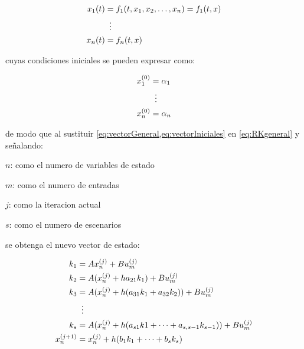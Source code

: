             
            \begin{equation}\label{eq:vectorGeneral}
                \begin{aligned}
                    x_1(t) &= f_1(t, x_1, x_2, \dots, x_n) = f_1(t,x)\\
                    &\mathrel{\makebox[\widthof{=}]{\vdots}}\\
                    x_n(t) &=  f_n(t,x)
                \end{aligned}
            \end{equation}

            \noindent cuyas condiciones iniciales se pueden expresar como:

            \begin{equation}\label{eq:vectorIniciales}
                \begin{aligned}
                    x_1^{(0)} &= \alpha_1\\
                    &\mathrel{\makebox[\widthof{=}]{\vdots}}\\
                    x_n^{(0)} &=  \alpha_n
                \end{aligned}
            \end{equation}
            
            \noindent de modo que al sustituir \cref{eq:vectorGeneral,eq:vectorIniciales} en \cref{eq:RKgeneral} y señalando:

            \vfill 

            \begin{spacing}{1.5}
				
				$n$: como el numero de variables de estado
				
				$m$: como el numero de entradas
				
				$j$: como la iteracion actual
                
                $s$: como el numero de escenarios
            \end{spacing}

            \vfill
            \pagebreak

            \noindent se obtenga el nuevo vector de estado:

            \begin{equation}\label{eq:RKstate}
                \begin{aligned}
                    k_1 &= Ax_n^{(j)} + Bu_m^{(j)}\\
                    k_2 &= A(x_n^{(j)} +  ha_{21}k_1) + Bu_m^{(j)}\\
                    k_3 &= A(x_n^{(j)} +  h(a_{31}k_1 + a_{32}k_2)) + Bu_m^{(j)}\\
                    &\mathrel{\makebox[\widthof{=}]{\vdots}}\\
                    k_s &= A(x_n^{(j)} + h(a_{s1}k1 + \cdots +  a_{s,s-1}k_{s-1})) + Bu_m^{(j)}\\
                    x_n^{(j+1)} &= x_n^{(j)} + h(b_1 k_1 + \cdots + b_s k_s)
                \end{aligned}
            \end{equation}
            
